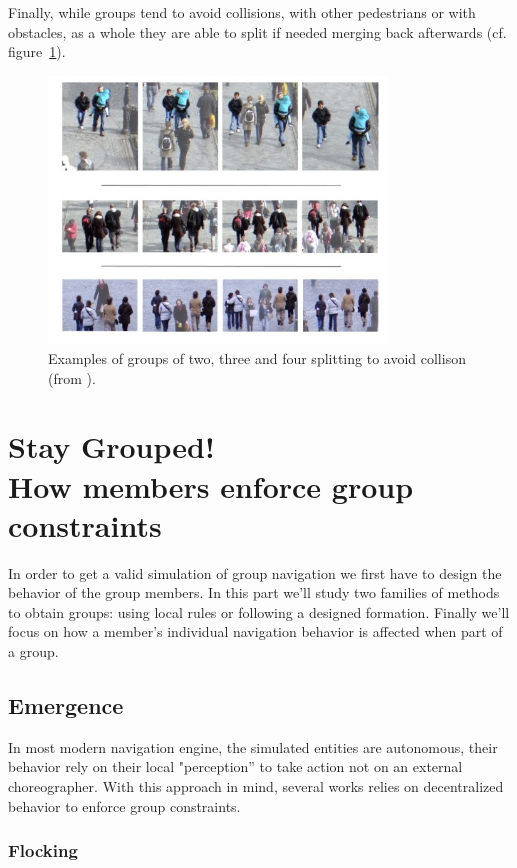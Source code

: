 \documentclass{article}
\newcommand{\sectionwithsubtitle}[2]{\section[#1]{#1\\[1ex]\large#2}}
\begin{document}
Finally, while groups tend to avoid collisions, with other pedestrians or with obstacles, as a whole they are able to split if needed merging back afterwards (cf. figure~\ref{fig:social_groups_splitting}).

\begin{figure}[htb]
\centering
\includegraphics[width=0.8\textwidth]{SocialGroupsSplitting.jpg}
\caption{Examples of groups of two, three and four splitting to avoid collison (from \cite{Peters:2009kx}).}
\label{fig:social_groups_splitting}
\end{figure}

\sectionwithsubtitle{Stay Grouped!}{How members enforce group constraints}

In order to get a valid simulation of group navigation we first have to design the behavior of the group members. In this part we’ll study two families of methods to obtain groups: using local rules or following a designed formation. Finally we’ll focus on how a member’s individual navigation behavior is affected when part of a group.

\subsection{Emergence}

In most modern navigation engine, the simulated entities are autonomous, their behavior rely on their local "perception” to take action not on an external choreographer. With this approach in mind, several works relies on decentralized behavior to enforce group constraints.

\subsubsection{Flocking}
\end{document}
